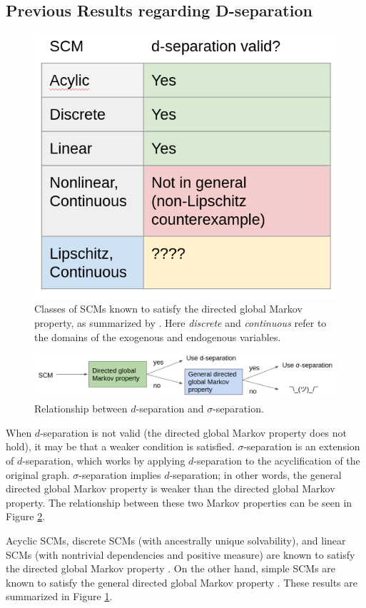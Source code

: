\documentclass[letterpaper,10pt]{article}
\begin{document}
\subsection{Previous Results regarding D-separation}

\begin{figure}
\centering
\includegraphics[width=.4\linewidth]{pics/my_own/review.png}
\caption{Classes of SCMs known to satisfy the directed global Markov property, as summarized by \cite{Foundations}. Here \emph{discrete} and \emph{continuous} refer to the domains of the exogenous and endogenous variables.}
\label{fig:review}
\end{figure}

\begin{figure}
\centering
\includegraphics[width=.8\linewidth]{pics/my_own/inputs_outputs.png}
\caption{Relationship between $d$-separation and $\sigma$-separation.}
\label{fig:inputs-outputs}
\end{figure}

When $d$-separation is not valid (the directed global Markov property does not hold), it may be that a weaker condition is satisfied. $\sigma$-separation is an extension of $d$-separation, which works by applying $d$-separation to the acyclification of the original graph. $\sigma$-separation implies $d$-separation; in other words, the general directed global Markov property is weaker than the directed global Markov property. The relationship between these two Markov properties can be seen in Figure \ref{fig:inputs-outputs}.

Acyclic SCMs, discrete SCMs (with ancestrally unique solvability), and linear SCMs (with nontrivial dependencies and positive measure) are known to satisfy the directed global Markov property \cite{MarkovCyclesLatent}. On the other hand, simple SCMs are known to satisfy the general directed global Markov property \cite{Foundations}. These results are summarized in Figure \ref{fig:review}.
\end{document}
